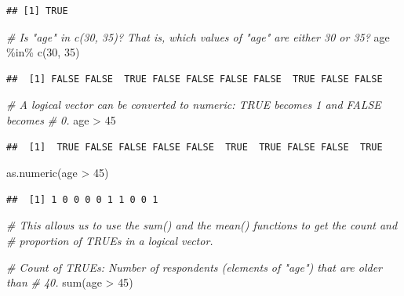 \documentclass[
]{book}
\newenvironment{Shaded}{\begin{snugshade}}{\end{snugshade}}
\newcommand{\CommentTok}[1]{\textcolor[rgb]{0.56,0.35,0.01}{\textit{#1}}}
\newcommand{\DecValTok}[1]{\textcolor[rgb]{0.00,0.00,0.81}{#1}}
\newcommand{\FunctionTok}[1]{\textcolor[rgb]{0.00,0.00,0.00}{#1}}
\newcommand{\NormalTok}[1]{#1}
\newcommand{\SpecialCharTok}[1]{\textcolor[rgb]{0.00,0.00,0.00}{#1}}
\begin{document}
\begin{verbatim}
## [1] TRUE
\end{verbatim}

\begin{Shaded}
\begin{Highlighting}[]
\CommentTok{\# Is "age" in c(30, 35)? That is, which values of "age" are either 30 or 35?}
\NormalTok{age }\SpecialCharTok{\%in\%} \FunctionTok{c}\NormalTok{(}\DecValTok{30}\NormalTok{, }\DecValTok{35}\NormalTok{)}
\end{Highlighting}
\end{Shaded}

\begin{verbatim}
##  [1] FALSE FALSE  TRUE FALSE FALSE FALSE FALSE  TRUE FALSE FALSE
\end{verbatim}

\begin{Shaded}
\begin{Highlighting}[]
\CommentTok{\# A logical vector can be converted to numeric: TRUE becomes 1 and FALSE becomes}
\CommentTok{\# 0.}
\NormalTok{age }\SpecialCharTok{\textgreater{}} \DecValTok{45}
\end{Highlighting}
\end{Shaded}

\begin{verbatim}
##  [1]  TRUE FALSE FALSE FALSE FALSE  TRUE  TRUE FALSE FALSE  TRUE
\end{verbatim}

\begin{Shaded}
\begin{Highlighting}[]
\FunctionTok{as.numeric}\NormalTok{(age }\SpecialCharTok{\textgreater{}} \DecValTok{45}\NormalTok{)}
\end{Highlighting}
\end{Shaded}

\begin{verbatim}
##  [1] 1 0 0 0 0 1 1 0 0 1
\end{verbatim}

\begin{Shaded}
\begin{Highlighting}[]
\CommentTok{\# This allows us to use the sum() and the mean() functions to get the count and}
\CommentTok{\# proportion of TRUE\textquotesingle{}s in a logical vector.}

\CommentTok{\# Count of TRUE\textquotesingle{}s: Number of respondents (elements of "age") that are older than}
\CommentTok{\# 40.}
\FunctionTok{sum}\NormalTok{(age }\SpecialCharTok{\textgreater{}} \DecValTok{45}\NormalTok{)}
\end{Highlighting}
\end{Shaded}
\end{document}
